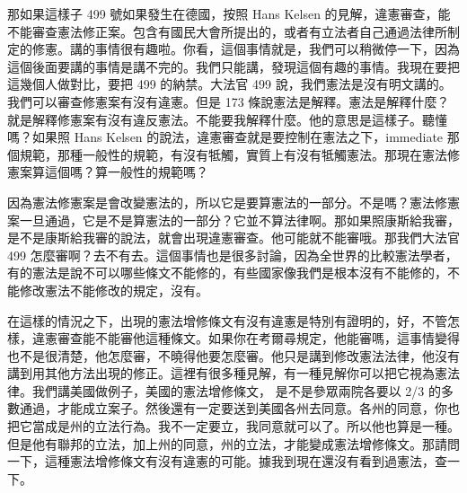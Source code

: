 \hypertarget{w05:cue:322}{}那如果這樣子 499 號如果發生在德國，按照 Hans Kelsen 的見解，違憲審查，能不能審查憲法修正案。包含有國民大會所提出的，或者有立法者自己通過法律所制定的修憲。講的事情很有趣啦。你看，這個事情就是，我們可以稍微停一下，因為這個後面要講的事情是講不完的。我們只能講，發現這個有趣的事情。我現在要把這幾個人做對比，要把 499 的納禁。大法官 499 說，我們憲法是沒有明文講的。
\hypertarget{w05:cue:323}{}我們可以審查修憲案有沒有違憲。但是 173 條說憲法是解釋。憲法是解釋什麼？就是解釋修憲案有沒有違反憲法。不能要我解釋什麼。他的意思是這樣子。聽懂嗎？如果照 Hans Kelsen 的說法，違憲審查就是要控制在憲法之下，immediate 那個規範，那種一般性的規範，有沒有牴觸，實質上有沒有牴觸憲法。那現在憲法修憲案算這個嗎？算一般性的規範嗎？

\hypertarget{w05:cue:324}{}因為憲法修憲案是會改變憲法的，所以它是要算憲法的一部分。不是嗎？憲法修憲案一旦通過，它是不是算憲法的一部分？它並不算法律啊。那如果照康斯給我審，是不是康斯給我審的說法，就會出現違憲審查。他可能就不能審哦。那我們大法官 499 怎麼審啊？去不有去。這個事情也是很多討論，因為全世界的比較憲法學者，有的憲法是說不可以哪些條文不能修的，有些國家像我們是根本沒有不能修的，不能修改憲法不能修改的規定，沒有。

\hypertarget{w05:cue:325}{}在這樣的情況之下，出現的憲法增修條文有沒有違憲是特別有證明的，好，不管怎樣，違憲審查能不能審他這種條文。如果你在考爾尋規定，他能審嗎，這事情變得也不是很清楚，他怎麼審，不曉得他要怎麼審。他只是講到修改憲法法律，他沒有講到用其他方法出現的修正。這裡有很多種見解，有一種見解你可以把它視為憲法律。我們講美國做例子，美國的憲法增修條文，
\hypertarget{w05:cue:326}{}是不是參眾兩院各要以 2/3 的多數通過，才能成立案子。然後還有一定要送到美國各州去同意。各州的同意，你也把它當成是州的立法行為。我不一定要立，我同意就可以了。所以他也算是一種。但是他有聯邦的立法，加上州的同意，州的立法，才能變成憲法增修條文。那請問一下，這種憲法增修條文有沒有違憲的可能。據我到現在還沒有看到過憲法，查一下。

